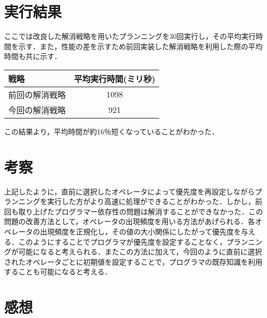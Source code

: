 \documentclass[a4j]{jarticle}
\begin{document}
\section{実行結果}
ここでは改良した解消戦略を用いたプランニングを30回実行し，その平均実行時間を示す．また，性能の差を示すため前回実装した解消戦略を利用した際の平均時間も共に示す．
\begin{table}[H]
\begin{center}
\begin{tabular}{|l|c|}
\hline
戦略 & 平均実行時間(ミリ秒) \\ 
\hline
前回の解消戦略 & 1098 \\ \hline
今回の解消戦略 & 921 \\ \hline
\end{tabular}
\end{center}
\end{table}
この結果より，平均時間が約16％短くなっていることがわかった．
\section{考察}
上記したように，直前に選択したオペレータによって優先度を再設定しながらプランニングを実行した方がより高速に処理ができることがわかった．しかし，前回も取り上げたプログラマー依存性の問題は解消することができなかった．この問題の改善方法として，オペレータの出現頻度を用いる方法があげられる．各オペレータの出現頻度を正規化し，その値の大小関係にしたがって優先度を与える．このようにすることでプログラマが優先度を設定することなく，プランニングが可能になると考えられる．またこの方法に加えて，今回のように直前に選択されたオペレータごとに初期値を設定することで，プログラマの既存知識を利用することも可能になると考える．
\section{感想}
\end{document}
